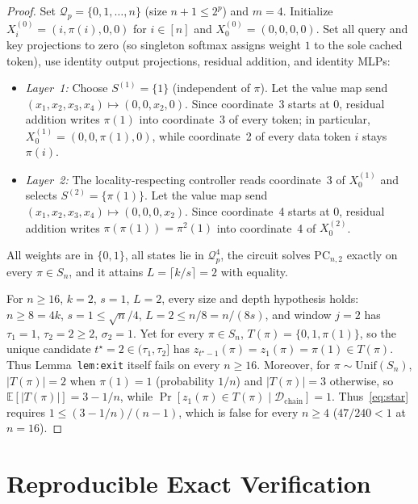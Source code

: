 \documentclass[11pt]{article}
\theoremstyle{plain}
\theoremstyle{definition}
\theoremstyle{remark}
\newcommand{\PC}{\mathrm{PC}}
\begin{document}
\begin{proof}
Set $\mathcal{Q}_p = \{0, 1, \dots, n\}$ (size $n + 1 \le 2^p$) and $m = 4$. Initialize $X^{(0)}_i = (i, \pi(i), 0, 0)$ for $i \in [n]$ and $X^{(0)}_0 = (0, 0, 0, 0)$. Set all query and key projections to zero (so singleton softmax assigns weight $1$ to the sole cached token), use identity output projections, residual addition, and identity MLPs:
\begin{itemize}[leftmargin=2em,itemsep=1pt,topsep=2pt]
\item \emph{Layer~1:} Choose $S^{(1)} = \{1\}$ (independent of $\pi$). Let the value map send $(x_1, x_2, x_3, x_4) \mapsto (0, 0, x_2, 0)$. Since coordinate~3 starts at $0$, residual addition writes $\pi(1)$ into coordinate~3 of every token; in particular, $X^{(1)}_0 = (0, 0, \pi(1), 0)$, while coordinate~2 of every data token $i$ stays $\pi(i)$.
\item \emph{Layer~2:} The locality-respecting controller reads coordinate~3 of $X^{(1)}_0$ and selects $S^{(2)} = \{\pi(1)\}$. Let the value map send $(x_1, x_2, x_3, x_4) \mapsto (0, 0, 0, x_2)$. Since coordinate~4 starts at $0$, residual addition writes $\pi(\pi(1)) = \pi^2(1)$ into coordinate~4 of $X^{(2)}_0$.
\end{itemize}
All weights are in $\{0, 1\}$, all states lie in $\mathcal{Q}_p^4$, the circuit solves $\PC_{n,2}$ exactly on every $\pi \in S_n$, and it attains $L = \lceil k/s \rceil = 2$ with equality.

For $n \ge 16$, $k = 2$, $s = 1$, $L = 2$, every size and depth hypothesis holds: $n \ge 8 = 4k$, $s = 1 \le \sqrt{n}/4$, $L = 2 \le n/8 = n/(8s)$, and window $j = 2$ has $\tau_1 = 1$, $\tau_2 = 2 \ge 2$, $\sigma_2 = 1$.
Yet for every $\pi \in S_n$, $T(\pi) = \{0, 1, \pi(1)\}$, so the unique candidate $t^\star = 2 \in (\tau_1, \tau_2]$ has $z_{t^\star - 1}(\pi) = z_1(\pi) = \pi(1) \in T(\pi)$.
Thus Lemma~\texttt{lem:exit} itself fails on every $n \ge 16$.
Moreover, for $\pi \sim \mathrm{Unif}(S_n)$, $|T(\pi)| = 2$ when $\pi(1) = 1$ (probability $1/n$) and $|T(\pi)| = 3$ otherwise, so $\mathbb{E}[|T(\pi)|] = 3 - 1/n$, while $\Pr[z_1(\pi) \in T(\pi) \mid \mathcal{D}_{\mathrm{chain}}] = 1$. Thus~\eqref{eq:star} requires $1 \le (3 - 1/n)/(n - 1)$, which is false for every $n \ge 4$ ($47/240 < 1$ at $n = 16$).
\end{proof}

\section{Reproducible Exact Verification}
\end{document}
